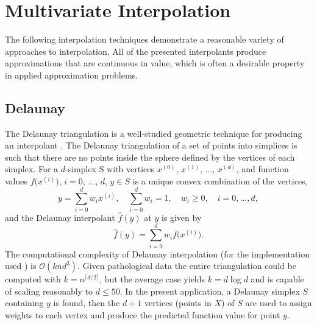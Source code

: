 \section{Multivariate Interpolation}
\label{sec:interpolation}
The following interpolation techniques demonstrate a reasonable
variety of approaches to interpolation. All of the presented
interpolants produce approximations that are continuous in value,
which is often a desirable property in applied approximation problems.

\subsection{Delaunay}
\label{sec:delaunay}

The Delaunay triangulation is a well-studied geometric technique for
producing an interpolant \cite{lee1980two}. The Delaunay triangulation
of a set of points into simplices is such that there
are no points inside the sphere defined by the
vertices of each simplex. For a $d$-simplex S with vertices $x^{(0)}$,
$x^{(1)}$, $\ldots$, $x^{(d)}$, and function values
$f\bigl(x^{(i)}\bigr)$, $i=0$, $\ldots$, $d$, $y \in S$ is a unique
convex combination of the vertices,
 $$ y = \sum_{i=0}^{d} w_i x^{(i)}, \quad \sum_{i=0}^{d} w_i = 1, \quad w_i \geq 0, \quad i=0,\ldots,d, $$
and the Delaunay interpolant $\hat f(y)$ at $y$ is given by
 $$ \hat f(y) = \sum_{i=0}^{d} w_i f\bigl(x^{(i)}\bigr). $$ The
computational complexity of Delaunay interpolation (for the
implementation used \cite{chang2018polynomial}) is $\mathcal{O}(k n
d^3)$. Given pathological data the entire triangulation could be
computed with $k = n^{\lceil d / 2 \rceil}$, but the average case yields
$k = d \log d$ and is capable of scaling reasonably to $d \leq 50$. In
the present application, a Delaunay simplex $S$ containing $y$ is
found, then the $d+1$ vertices (points in $X$) of $S$ are used to
assign weights to each vertex and produce the predicted function value
for point $y$.

